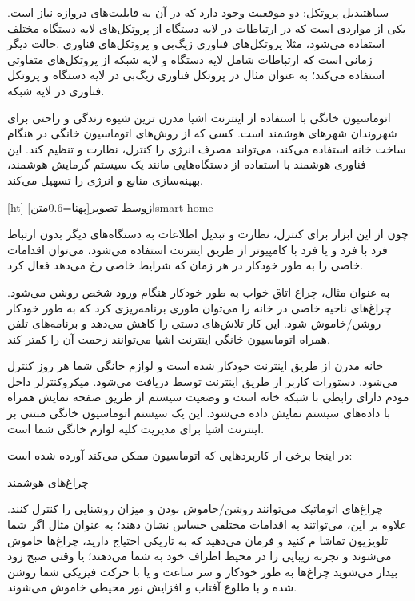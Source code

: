  ‌سیاه{تبدیل پروتکل}:
دو موقعیت وجود دارد که در آن به قابلیت‌های دروازه نیاز است. یکی از مواردی است که در ارتباطات در لایه دستگاه از پروتکل‌های لایه دستگاه مختلف استفاده می‌شود، مثلا پروتکل‌های فناوری زیگ‌بی و پروتکل‌های فناوری .حالت دیگر زمانی است که ارتباطات شامل لایه دستگاه و لایه شبکه از پروتکل‌های متفاوتی استفاده می‌کند؛ به عنوان مثال در پروتکل فناوری زیگ‌بی در لایه دستگاه و پروتکل فناوری  در لایه شبکه.



اتوماسیون خانگی با استفاده از اینترنت اشیا مدرن ترین شیوه زندگی و راحتی برای شهروندان شهرهای هوشمند است. کسی که از روش‌های اتوماسیون خانگی در هنگام ساخت خانه استفاده می‌کند، می‌تواند مصرف انرژی را کنترل، نظارت و تنظیم کند. این فناوری هوشمند با استفاده از دستگاه‌هایی مانند یک سیستم گرمایش هوشمند، بهینه‌سازی منابع و انرژی را تسهیل می‌کند.

[ht]
‌ازوسط
‌تصویر[پهنا=0.6‌متن]{smart-home}

چون از این ابزار برای کنترل، نظارت و تبدیل اطلاعات به دستگاه‌های دیگر بدون ارتباط فرد با فرد و یا فرد با کامپیوتر از طریق اینترنت استفاده می‌شود، می‌توان اقدامات خاصی را به طور خودکار در هر زمان که شرایط خاصی رخ می‌دهد فعال کرد.

به عنوان مثال، چراغ اتاق خواب به طور خودکار هنگام ورود شخص روشن می‌شود. چراغ‌های ناحیه خاصی در خانه را می‌توان طوری برنامه‌ریزی کرد که به طور خودکار روشن/خاموش شود. این کار تلاش‌های دستی را کاهش می‌دهد و برنامه‌های تلفن همراه اتوماسیون خانگی اینترنت اشیا می‌توانند زحمت آن را کمتر کند.

خانه مدرن از طریق اینترنت خودکار شده است و لوازم خانگی شما هر روز کنترل می‌شود. دستورات کاربر از طریق اینترنت توسط  دریافت می‌شود. میکروکنترلر داخل مودم دارای رابطی با شبکه خانه است و وضعیت سیستم از طریق صفحه نمایش همراه با داده‌های سیستم نمایش داده می‌شود. این یک سیستم اتوماسیون خانگی مبتنی بر اینترنت اشیا برای مدیریت کلیه لوازم خانگی شما است.

در اینجا برخی از کاربردهایی که اتوماسیون  ممکن می‌کند آورده شده است:

 چراغ‌های هوشمند

چراغ‌های اتوماتیک می‌توانند روشن/خاموش بودن و میزان روشنایی را کنترل کنند. علاوه بر این، می‌تواتند به اقدامات مختلفی حساس نشان دهند؛ به عنوان مثال اگر شما تلویزیون تماشا م‌ کنید و فرمان می‌دهید که به تاریکی احتیاج دارید، چراغ‌ها خاموش می‌شوند و تجربه زیبایی را در محیط اطراف خود به شما می‌دهند؛ یا وقتی صبح زود بیدار می‌شوید چراغ‌ها به طور خودکار و سر ساعت و یا با حرکت فیزیکی شما روشن شده و با طلوع آفتاب و افزایش نور محیطی خاموش می‌شوند.

